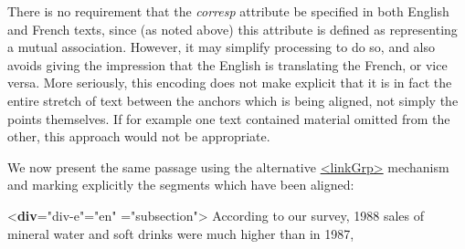 There is no requirement that the {\itshape corresp} attribute be specified in both English and French texts, since (as noted above) this attribute is defined as representing a mutual association. However, it may simplify processing to do so, and also avoids giving the impression that the English is translating the French, or vice versa. More seriously, this encoding does not make explicit that it is in fact the entire stretch of text between the anchors which is being aligned, not simply the points themselves. If for example one text contained material omitted from the other, this approach would not be appropriate.\par
We now present the same passage using the alternative \hyperref[TEI.linkGrp]{<linkGrp>} mechanism and marking explicitly the segments which have been aligned: \par\bgroup{}\exampleFont \begin{shaded}\noindent\mbox{}{<\textbf{div}\hspace*{1em}{xml:id}="{div-e}"\hspace*{1em}{xml:lang}="{en}"\mbox{}\newline 
\hspace*{1em}{type}="{subsection}">}\mbox{}\newline 
{}\mbox{}\newline 
\hspace*{1em}According to our survey, 1988 sales of mineral\mbox{}\newline 
\hspace*{1em}\hspace*{1em}\hspace*{1em}\hspace*{1em} water and soft drinks were much higher than in 1987,\mbox{}\newline 

\end{shaded}
